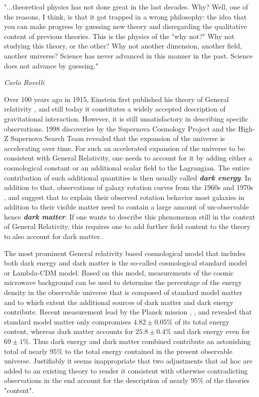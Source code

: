\setlength{\epigraphwidth}{0.6\textwidth}
\epigraph{"...theoretical physics has not done great in the last decades. Why? Well, one of the reasons, I think, is that it got trapped in a wrong philosophy: the idea that you can make progress by guessing new theory and disregarding the qualitative content of previous theories. This is the physics of the "why not?" Why not studying this theory, or the other? Why not another dimension, another field, another universe? Science has never advanced in this manner in the past. Science does not advance by guessing."}{\textit{Carlo Rovelli}}

Over 100 years ago in 1915, Einstein first published his theory of General relativity \cite{1915SPAW.......844E}, and still today it constitutes a widely accepted description of gravitational interaction. However, it is still unsatisfactory in describing specific observations. 1998 discoveries by the Supernova Cosmology Project \cite{1999ApJ...517..565P} and the High-Z Supernova Search Team \cite{1998AJ....116.1009R} revealed that the expansion of the universe is accelerating over time. For such an accelerated expansion of the universe to be consistent with General Relativity, one needs to account for it by adding either a cosmological constant or an additional scalar field to the Lagrangian. The entire contribution of such additional quantities is then usually called \textit{\textbf{dark energy}}.
In addition to that, observations of galaxy rotation curves from the 1960s and 1970s \cite{1970ApJ...160..811F}, \cite{1970ApJ...159..379R} and \cite{1980ApJ...238..471R} suggest that to explain their observed rotation behavior most galaxies in addition to their visible matter need to contain a large amount of un-observable hence \textit{\textbf{dark matter}}.
If one wants to describe this phenomenon still in the context of General Relativity, this requires one to add further field content to the theory to also account for dark matter. 

The most prominent General relativity based cosmological model that includes both dark energy and dark matter is the so-called cosmological standard model or Lambda-CDM model. Based on this model, measurements of the cosmic microwave background can be used to determine the percentage of the energy density in the observable universe that is composed of standard model matter and to which extent the additional sources of dark matter and dark energy contribute. Recent measurement lead by the Planck mission \cite{Planck13_1}, \cite{Planck13_2}, \cite{Planck15} and \cite{Planck18} revealed that standard model matter only compromises $4.82\pm0.05\%$ of its total energy content, whereas dark matter accounts for $ 25.8\pm0.4\%$ and dark energy even for $ 69 \pm 1 \%$. Thus dark energy and dark matter combined contribute an astonishing total of nearly $95 \%$ to the total energy contained in the present observable universe.
Justifiably it seems inappropriate that two adjustments that ad hoc are added to an existing theory to render it consistent with otherwise contradicting observations in the end account for the description of nearly $95\%$ of the theories "content".  

